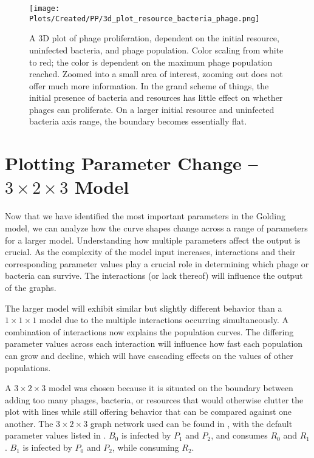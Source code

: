 \begin{figure}[ht!]
    \texttt{[image: Plots/Created/PP/3d\_plot\_resource\_bacteria\_phage.png]}
    \centering
    \caption{
        A 3D plot of phage proliferation, dependent on the initial resource, uninfected bacteria, and phage population. 
        Color scaling from white to red; the color is dependent on the maximum phage population reached. 
        Zoomed into a small area of interest, zooming out does not offer much more information. 
        In the grand scheme of things, the initial presence of bacteria and resources has little effect on whether phages can proliferate. 
        On a larger initial resource and uninfected bacteria axis range, the boundary becomes essentially flat. 
        \label{fig:created:3D_phase_portrait}
    }
\end{figure}

\section{Plotting Parameter Change – $3\times 2\times 3$ Model}
Now that we have identified the most important parameters in the Golding model, we can analyze how the curve shapes change across a range of parameters for a larger model. 
Understanding how multiple parameters affect the output is crucial. 
As the complexity of the model input increases, interactions and their corresponding parameter values play a crucial role in determining which phage or bacteria can survive. 
The interactions (or lack thereof) will influence the output of the graphs. 

The larger model will exhibit similar but slightly different behavior than a $1\times 1\times 1$ model due to the multiple interactions occurring simultaneously. 
A combination of interactions now explains the population curves. 
The differing parameter values across each interaction will influence how fast each population can grow and decline, which will have cascading effects on the values of other populations. 

A $3\times 2\times 3$ model was chosen because it is situated on the boundary between adding too many phages, bacteria, or resources that would otherwise clutter the plot with lines while still offering behavior that can be compared against one another. 
The $3\times 2\times 3$ graph network used can be found in , with the default parameter values listed in . 
$B_0$ is infected by $P_1$ and $P_2$, and consumes $R_0$ and $R_1$. 
$B_1$ is infected by $P_0$ and $P_2$, while consuming $R_2$. 

